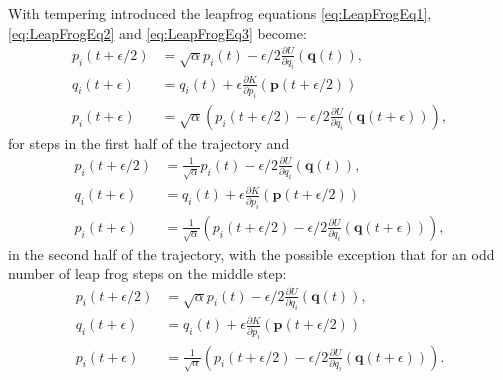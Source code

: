 \documentclass[12pt]{article}
\begin{document}
    With tempering introduced the leapfrog equations \ref{eq:LeapFrogEq1},\ref{eq:LeapFrogEq2} and \ref{eq:LeapFrogEq3} become:
    \begin{align}
        \label{eq:TLeapFrogEq1} p_i\left(t+\epsilon/2\right) & = \sqrt{\alpha}p_i\left(t\right) - \epsilon/2\frac{\partial U}{\partial q_i}\left(\bm{q}\left(t\right)\right), \\
        \label{eq:TLeapFrogEq2}q_i\left(t+\epsilon\right) & = q_i\left(t\right) + \epsilon\frac{\partial K}{\partial p_i}\left(\bm{p}\left(t+\epsilon/2\right)\right) \\
        \label{eq:TLeapFrogEq3}p_i\left(t+\epsilon\right) & = \sqrt{\alpha}\left(p_i\left(t+\epsilon/2\right) - \epsilon/2\frac{\partial U}{\partial q_i}\left(\bm{q}\left(t+\epsilon\right)\right)\right),
    \end{align}
    for steps in the first half of the trajectory and 
    \begin{align}
        p_i\left(t+\epsilon/2\right) & = \frac{1}{\sqrt{\alpha}}p_i\left(t\right) - \epsilon/2\frac{\partial U}{\partial q_i}\left(\bm{q}\left(t\right)\right), \\
        q_i\left(t+\epsilon\right) & = q_i\left(t\right) + \epsilon\frac{\partial K}{\partial p_i}\left(\bm{p}\left(t+\epsilon/2\right)\right) \\
        p_i\left(t+\epsilon\right) & = \frac{1}{\sqrt{\alpha}}\left(p_i\left(t+\epsilon/2\right) - \epsilon/2\frac{\partial U}{\partial q_i}\left(\bm{q}\left(t+\epsilon\right)\right)\right),
    \end{align}
    in the second half of the trajectory, with the possible exception that for an odd number of leap frog steps on the middle step:
    \begin{align}
         p_i\left(t+\epsilon/2\right) & = \sqrt{\alpha}p_i\left(t\right) - \epsilon/2\frac{\partial U}{\partial q_i}\left(\bm{q}\left(t\right)\right), \\
        q_i\left(t+\epsilon\right) & = q_i\left(t\right) + \epsilon\frac{\partial K}{\partial p_i}\left(\bm{p}\left(t+\epsilon/2\right)\right) \\
        p_i\left(t+\epsilon\right) & = \frac{1}{\sqrt{\alpha}}\left(p_i\left(t+\epsilon/2\right) - \epsilon/2\frac{\partial U}{\partial q_i}\left(\bm{q}\left(t+\epsilon\right)\right)\right).
    \end{align}
\end{document}
